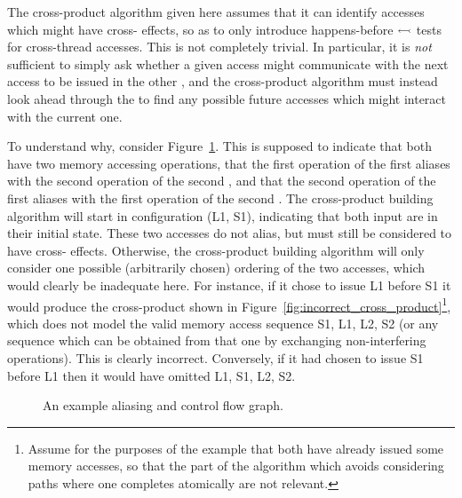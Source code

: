 
The cross-product algorithm given here assumes that it can identify
accesses which might have cross-{\StateMachine} effects, so as to only
introduce happens-before $\leftarrowtail$ tests for cross-thread
accesses.  This is not completely trivial.  In particular, it is
\emph{not} sufficient to simply ask whether a given access might
communicate with the next access to be issued in the other
{\StateMachine}, and the cross-product algorithm must instead look
ahead through the {\StateMachines} to find any possible future
accesses which might interact with the current one.

To understand why, consider
Figure~\ref{fig:cross_product:example_aliasing}.  This is supposed to
indicate that both {\StateMachines} have two memory accessing
operations, that the first operation of the first {\StateMachine}
aliases with the second operation of the second {\StateMachine}, and
that the second operation of the first {\StateMachine} aliases with
the first operation of the second {\StateMachine}.  The cross-product
building algorithm will start in configuration (L1, S1), indicating
that both input {\StateMachines} are in their initial state.  These
two accesses do not alias, but must still be considered to have
cross-{\StateMachine} effects.  Otherwise, the cross-product building
algorithm will only consider one possible (arbitrarily chosen)
ordering of the two accesses, which would clearly be inadequate here.
For instance, if it chose to issue L1 before S1 it would produce the
cross-product {\StateMachine} shown in
Figure~\ref{fig:incorrect_cross_product}\footnote{Assume for the
  purposes of the example that both {\StateMachines} have already
  issued some memory accesses, so that the part of the algorithm which
  avoids considering paths where one {\StateMachine} completes
  atomically are not relevant.}, which does not model the valid memory
access sequence S1, L1, L2, S2 (or any sequence which can be obtained
from that one by exchanging non-interfering operations).  This is
clearly incorrect.  Conversely, if it had chosen to issue S1 before L1
then it would have omitted L1, S1, L2, S2.

\begin{figure}
  \caption{An example aliasing and control flow graph. }
  \label{fig:cross_product:example_aliasing}
\end{figure}

